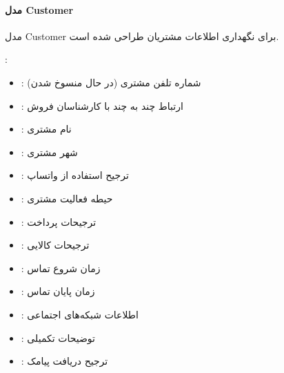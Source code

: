 \documentclass[letterpaper,10pt,english]{sphinxmanual}
\begin{document}
\paragraph{مدل Customer}
\label{\detokenize{modules/core:customer}}
\sphinxAtStartPar
مدل Customer برای نگهداری اطلاعات مشتریان طراحی شده است.

\sphinxAtStartPar
{}:
\begin{itemize}
\item {} 
\sphinxAtStartPar
{}: شماره تلفن مشتری (در حال منسوخ شدن)

\item {} 
\sphinxAtStartPar
{}: ارتباط چند به چند با کارشناسان فروش

\item {} 
\sphinxAtStartPar
{}: نام مشتری

\item {} 
\sphinxAtStartPar
{}: شهر مشتری

\item {} 
\sphinxAtStartPar
{}: ترجیح استفاده از واتساپ

\item {} 
\sphinxAtStartPar
{}: حیطه فعالیت مشتری

\item {} 
\sphinxAtStartPar
{}: ترجیحات پرداخت

\item {} 
\sphinxAtStartPar
{}: ترجیحات کالایی

\item {} 
\sphinxAtStartPar
{}: زمان شروع تماس

\item {} 
\sphinxAtStartPar
{}: زمان پایان تماس

\item {} 
\sphinxAtStartPar
{}: اطلاعات شبکه‌های اجتماعی

\item {} 
\sphinxAtStartPar
{}: توضیحات تکمیلی

\item {} 
\sphinxAtStartPar
{}: ترجیح دریافت پیامک


\end{itemize}
\end{document}
